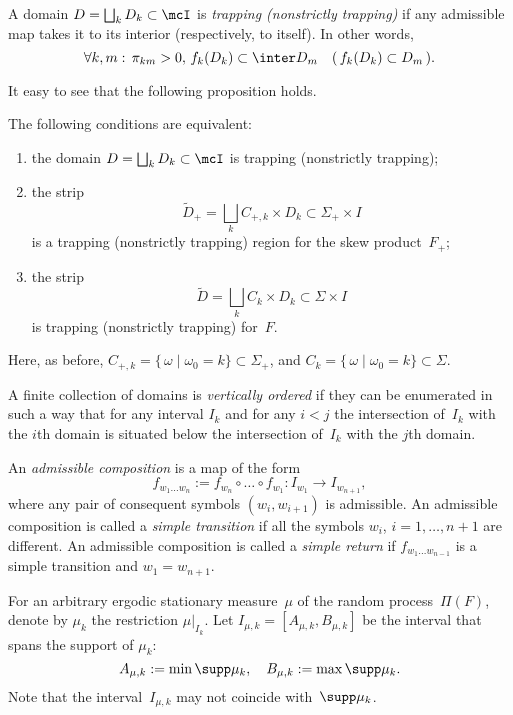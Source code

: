 \documentclass[a4paper,12pt]{amsart}
\begin{document}
\begin{Def}
A domain $D=\bigsqcup_k D_k \subset \mcI$ is \emph{trapping (nonstrictly trapping)} if
any admissible map takes it to its interior (respectively, to itself). In other words,
$$
\forall k,m: \, \pi_{km} > 0, \, f_k(D_k) \subset \inter D_m \quad ( \, f_k(D_k) \subset D_m \, ).
$$
\end{Def}

It easy to see that the following proposition holds.
\begin{Prop}    \label{p:absorb}
The following conditions are equivalent:
\begin{enumerate}
\item the domain $D=\bigsqcup_k D_k \subset \mcI$ is trapping (nonstrictly trapping);
\item the strip
$$
\tilde{D}_+=\bigsqcup_k C_{+,k} \times D_k \subset \Sigma_+ \times I
$$
is a trapping (nonstrictly trapping) region for the skew product~$F_+$;
\item the strip
\begin{equation}\label{eq:Ds}
\tilde{D}=\bigsqcup_k C_k \times D_k \subset \Sigma \times I
\end{equation}
is trapping (nonstrictly trapping) for~$F$.
\end{enumerate}
Here, as before, $C_{+,k} = \{\, \omega \mid \omega_0 = k \} \subset \Sigma_+$, and $C_k = \{\, \omega \mid \omega_0 = k \} \subset \Sigma$.
\end{Prop}

\begin{Def}
A finite collection of domains is \emph{vertically ordered} if they can be enumerated in such a way that for any interval $I_k$ and for any $i<j$ the intersection of~$I_k$ with the $i$th domain is situated below the intersection of~$I_k$ with the $j$th domain.
\end{Def}

\begin{Def} \label{def:perehod}
An \emph{admissible composition} is a map of the form
$$
f_{w_1 \dots w_n} := f_{w_n}\circ \dots \circ f_{w_1}\colon I_{w_1}\to I_{w_{n+1}},
$$
where any pair of consequent symbols $(w_i,w_{i+1})$ is admissible. An admissible composition is called a \emph{simple transition} if all the symbols $w_i$, $i=1,\dots,n+1$ are different. An admissible composition is called a \emph{simple return} if $f_{w_1 \dots w_{n-1}}$ is a simple transition and $w_1=w_{n+1}$.
\end{Def}

For an arbitrary ergodic stationary measure~$\mu$ of the random process~$\Pi(F)$, denote by $\mu_k$ the restriction $\mu|_{I_k}$. Let $I_{\mu,k}=[A_{\mu,k}, B_{\mu,k}]$ be the interval that spans the support of $\mu_k$:
$$
A_{\mu,k}:= \min\supp \mu_k, \quad B_{\mu,k}:= \max\supp \mu_k.
$$
Note that the interval~$I_{\mu,k}$ may not coincide with~$\supp \mu_k$.
\end{document}
